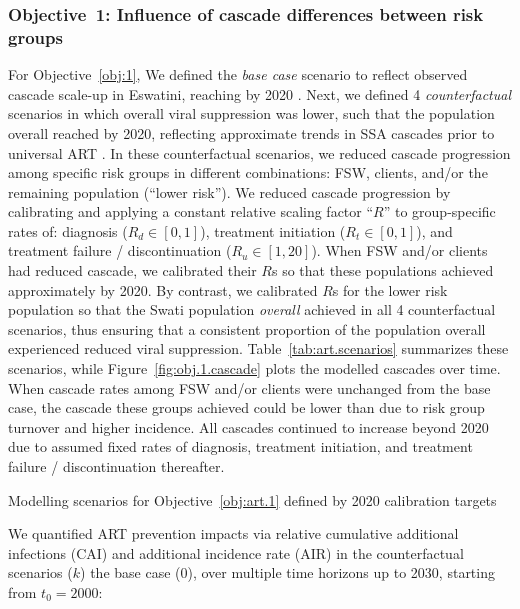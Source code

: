 \subsubsection*{Objective~1: Influence of cascade differences between risk groups}\label{meth.obj.1}
For Objective~\ref{obj:1},
We defined the \emph{base case} scenario to reflect
observed cascade scale-up in Eswatini, reaching \cashi by 2020 \cite{AIDSinfo}.
Next, we defined 4 \emph{counterfactual} scenarios in which overall viral suppression was lower,
such that the population overall reached \casmd by 2020,
reflecting approximate trends in SSA cascades prior to universal ART \cite{AIDSinfo}.
In these counterfactual scenarios, we reduced cascade progression
among specific risk groups in different combinations:
FSW, clients, and/or the remaining population (``lower risk'').
We reduced cascade progression by calibrating and applying
a constant relative scaling factor ``$R$'' to group-specific rates of:
diagnosis ($R_d \in [0,1]$),
treatment initiation ($R_t \in [0,1]$), and
treatment failure / discontinuation ($R_u \in [1,20]$).
When FSW and/or clients had reduced cascade, we calibrated their $R$s so that
these populations achieved approximately \caslo by 2020.
By contrast, we calibrated $R$s for the lower risk population so that
the Swati population \emph{overall} achieved \casmd in all 4 counterfactual scenarios,
thus ensuring that a consistent proportion of the population overall
experienced reduced viral suppression.
Table~\ref{tab:art.scenarios} summarizes these scenarios, while
Figure~\ref{fig:obj.1.cascade} plots the modelled cascades over time.
When cascade rates among FSW and/or clients were unchanged from the base case,
the cascade these groups achieved could be lower than \cashi
due to risk group turnover and higher incidence.
All cascades continued to increase beyond 2020 due to assumed fixed rates of
diagnosis, treatment initiation, and treatment failure / discontinuation thereafter.
\begin{table}
  \centering
  \caption{Modelling scenarios for Objective~\ref{obj:art.1} defined by 2020 calibration targets}
  \label{tab:art.scenarios}
  
\end{table}
\par
We quantified ART prevention impacts via relative
cumulative additional infections (CAI) and additional incidence rate (AIR)
in the counterfactual scenarios ($k$) \vs the base case ($0$),
over multiple time horizons up to 2030, starting from $t_0 = 2000$:
